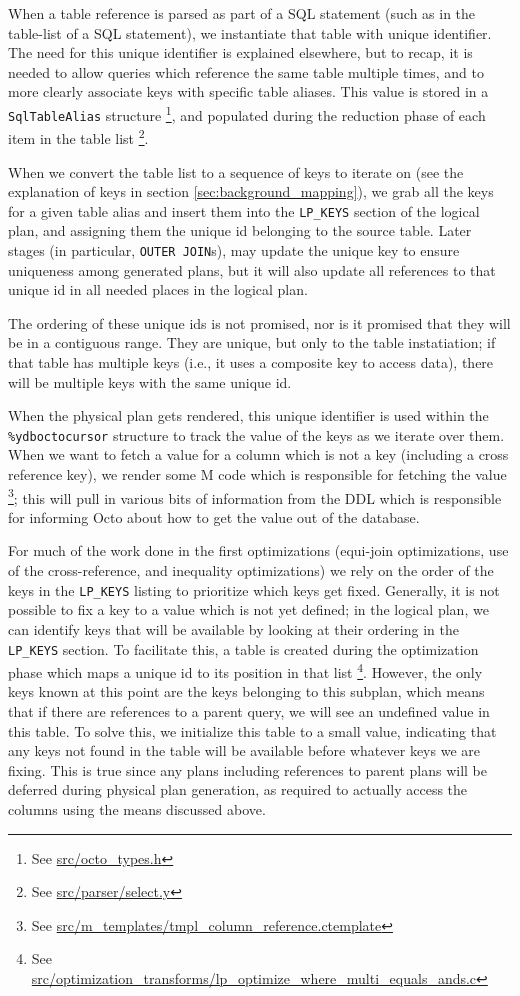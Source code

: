 \documentclass[]{article}
\def\code#1{\texttt{#1}}
\newcommand{\gitlab}[1]{\footnote{See \href{https://gitlab.com/YottaDB/DBMS/YDBOcto/blob/master/#1}{#1}}}
\begin{document}
When a table reference is parsed as part of a SQL statement (such as in the table-list of a SQL statement), we instantiate that table with unique identifier.
The need for this unique identifier is explained elsewhere, but to recap, it is needed to allow queries which reference the same table multiple times, and to more clearly associate keys with specific table aliases.
This value is stored in a \code{SqlTableAlias} structure \gitlab{src/octo\_types.h}, and populated during the reduction phase of each item in the table list \gitlab{src/parser/select.y}.

When we convert the table list to a sequence of keys to iterate on (see the explanation of keys in section \ref{sec:background_mapping}), we grab all the keys for a given table alias and insert them into the \code{LP\_KEYS} section of the logical plan, and assigning them the unique id belonging to the source table.
Later stages (in particular, \code{OUTER JOIN}s), may update the unique key to ensure uniqueness among generated plans, but it will also update all references to that unique id in all needed places in the logical plan.

The ordering of these unique ids is not promised, nor is it promised that they will be in a contiguous range.
They are unique, but only to the table instatiation; if that table has multiple keys (i.e., it uses a composite key to access data), there will be multiple keys with the same unique id.

When the physical plan gets rendered, this unique identifier is used within the \code{\%ydboctocursor} structure to track the value of the keys as we iterate over them.
When we want to fetch a value for a column which is not a key (including a cross reference key), we render some M code which is responsible for fetching the value \gitlab{src/m\_templates/tmpl\_column\_reference.ctemplate}; this will pull in various bits of information from the DDL which is responsible for informing Octo about how to get the value out of the database.

For much of the work done in the first optimizations (equi-join optimizations, use of the cross-reference, and inequality optimizations) we rely on the order of the keys in the \code{LP\_KEYS} listing to prioritize which keys get fixed.
Generally, it is not possible to fix a key to a value which is not yet defined; in the logical plan, we can identify keys that will be available by looking at their ordering in the \code{LP\_KEYS} section.
To facilitate this, a table is created during the optimization phase which maps a unique id to its position in that list \gitlab{src/optimization\_transforms/lp\_optimize\_where\_multi\_equals\_ands.c}.
However, the only keys known at this point are the keys belonging to this subplan, which means that if there are references to a parent query, we will see an undefined value in this table.
To solve this, we initialize this table to a small value, indicating that any keys not found in the table will be available before whatever keys we are fixing.
This is true since any plans including references to parent plans will be deferred during physical plan generation, as required to actually access the columns using the means discussed above.
\end{document}
